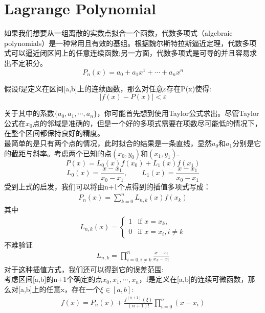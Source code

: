 \section{Lagrange Polynomial}
如果我们想要从一组离散的实数点拟合一个函数，代数多项式（algebraic polynomials）是一种常用且有效的基组。根据魏尔斯特拉斯逼近定理，代数多项式可以逼近闭区间上的任意连续函数\cite{Numerical};另一方面，代数多项式是可导的并且容易求出不定积分。
\begin{equation}
    P_n(x)=a_0+a_1x^1+\cdots+a_nx^n
\end{equation}
\begin{tauenv}[frametitle=Weierstrass Approximation Theorem:]
    假设f是定义在区间[a,b]上的连续函数，那么对任意$\varepsilon$存在P(x)使得:\\
    \begin{equation*}
        |f(x)-P(x)|<\varepsilon
    \end{equation*}
\end{tauenv}
关于其中的系数$\{a_0,a_1,\cdots,a_n\}$，你可能首先想到使用Taylor公式求出。尽管Taylor公式在$x_0$点的邻域是准确的，但是一个好的多项式需要在项数尽可能低的情况下，在整个区间都保持良好的精度。\\
最简单的是只有两个点的情况，此时拟合的结果是一条直线，显然$a_0$和$a_1$分别是它的截距与斜率。考虑两个已知的点$(x_0,y_0)$和$(x_1,y_1)$.
\begin{equation}
    P(x)=L_0(x)f(x_0)+L_1(x)f(x_1)
\end{equation}
\begin{equation*}
    L_0(x)=\frac{x-x_1}{x_0-x_1},\qquad L_1(x)=\frac{x-x_1}{x_0-x_1}
\end{equation*}
受到上式的启发，我们可以将由n+1个点得到的插值多项式写成：
\begin{align}
    P_n(x)=\sum_{k=0}^{n}L_{n,k}(x)f(x_k)
\end{align}
其中
\begin{align}
    L_{n,k}(x)=\left\{
        \begin{array}{rl}
        1 & \text{if } x =x_k,\\
        0 & \text{if } x = x_i,i\neq k
        \end{array} \right .
\end{align}
不难验证
\begin{align}
    L_{n,k}=\prod_{i=0,i\neq k}^{n}\frac{x-x_i}{x_k-x_i}
\end{align}
对于这种插值方式，我们还可以得到它的误差范围:\\
    考虑区间[a,b]的n+1个确定的点$x_0,x_1,\cdots,x_n$，f是定义在[a,b]的连续可微函数，那么对[a,b]上的任意x，存在一个$\xi\in[a,b]$:
    \begin{align}
        f(x)=P_n(x)+\frac{f^{(n+1)}(\xi)}{(n+1)!}\prod_{i=0}^n(x-x_i)
    \end{align}
